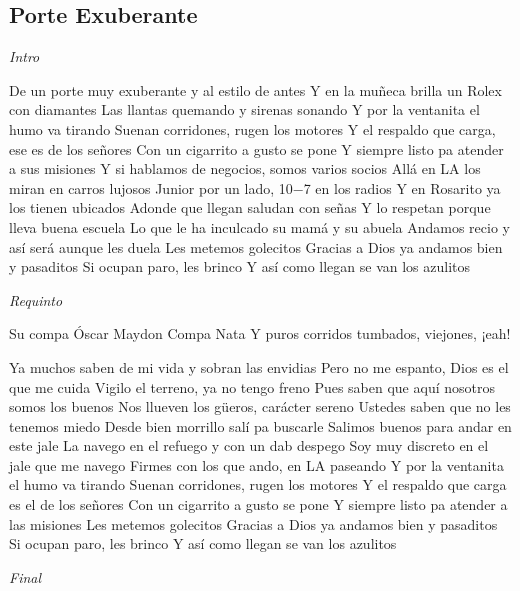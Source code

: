 \subsection{Porte Exuberante}

\noindent
\vspace{1cm}

\begin{guitar}
	\begin{multicols}{2}

		\textit{Intro}\par

De un porte muy exuberante y al estilo de antes
Y en la muñeca brilla un Rolex con diamantes
Las llantas quemando y sirenas sonando
Y por la ventanita el humo va tirando
Suenan corridones, rugen los motores
Y el respaldo que carga, ese es de los señores
Con un cigarrito a gusto se pone
Y siempre listo pa atender a sus misiones
Y si hablamos de negocios, somos varios socios
Allá en LA los miran en carros lujosos
Junior por un lado, 10$-$7 en los radios
Y en Rosarito ya los tienen ubicados
Adonde que llegan saludan con señas
Y lo respetan porque lleva buena escuela
Lo que le ha inculcado su mamá y su abuela
Andamos recio y así será aunque les duela
Les metemos golecitos
Gracias a Dios ya andamos bien y pasaditos
Si ocupan paro, les brinco
Y así como llegan se van los azulitos
\par
\textit{Requinto}
\par
Su compa Óscar Maydon
Compa Nata
Y puros corridos tumbados, viejones, ¡eah!

\par
Ya muchos saben de mi vida y sobran las envidias
Pero no me espanto, Dios es el que me cuida
Vigilo el terreno, ya no tengo freno
Pues saben que aquí nosotros somos los buenos
Nos llueven los güeros, carácter sereno
Ustedes saben que no les tenemos miedo
Desde bien morrillo salí pa buscarle
Salimos buenos para andar en este jale
La navego en el refuego y con un dab despego
Soy muy discreto en el jale que me navego
Firmes con los que ando, en LA paseando
Y por la ventanita el humo va tirando
Suenan corridones, rugen los motores
Y el respaldo que carga es el de los señores
Con un cigarrito a gusto se pone
Y siempre listo pa atender a las misiones
Les metemos golecitos
Gracias a Dios ya andamos bien y pasaditos
Si ocupan paro, les brinco
Y así como llegan se van los azulitos

\par

		\textit{Final}
\end{multicols}
\end{guitar}
